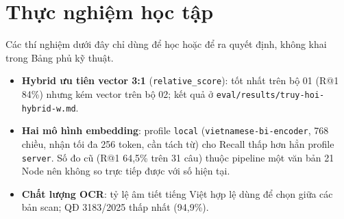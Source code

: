 \chapter{Thực nghiệm học tập}
\label{app:thuc-nghiem}

Các thí nghiệm dưới đây chỉ dùng để học hoặc để ra quyết định, không khai trong Bảng phủ kỹ thuật.

\begin{itemize}
  \item \textbf{Hybrid ưu tiên vector 3:1} (\texttt{relative\_score}): tốt nhất trên bộ 01 (R@1 84\%) nhưng
        kém vector trên bộ 02; kết quả ở \texttt{eval/results/truy-hoi-hybrid-w.md}.
  \item \textbf{Hai mô hình embedding}: profile \texttt{local} (\texttt{vietnamese-bi-encoder}, 768 chiều, nhận
        tối đa 256 token, cần tách từ) cho Recall thấp hơn hẳn profile \texttt{server}. Số đo cũ (R@1 64,5\% trên
        31 câu) thuộc pipeline một văn bản 21 Node nên không so trực tiếp được với số hiện tại.
  \item \textbf{Chất lượng OCR}: tỷ lệ âm tiết tiếng Việt hợp lệ dùng để chọn giữa các bản scan; QĐ 3183/2025
        thấp nhất (94,9\%).
\end{itemize}
